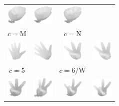 \documentclass[a4paper]{article}
\begin{document}
\begin{figure}
\begin{tabular}{cccc}
\includegraphics[width=1cm]{img/S01_C21_0058.eps} & 
\includegraphics[width=1cm]{img/S01_C22_0123.eps} & 
\includegraphics[width=1cm]{img/S01_C22m_0035.eps} \\ 
$c=\text{M}$ & & $c=\text{N}$ \\
\includegraphics[width=1cm]{img/S04_C05m_0172.eps} & 
\includegraphics[width=1cm]{img/S04_C05_0138.eps} & 
\includegraphics[width=1cm]{img/S04_C06_0073.eps} & 
\includegraphics[width=1cm]{img/S04_C06m_0080.eps} \\ 
$c=\text{5}$ & & $c=\text{6/W}$ \\
\includegraphics[width=1cm]{img/S01_C06m_0167.eps} & 
\includegraphics[width=1cm]{img/S01_C06_0015.eps} & 
\includegraphics[width=1cm]{img/S01_C07_0013.eps} & 
\includegraphics[width=1cm]{img/S01_C07m_0171.eps} \\ 

\end{tabular}
\end{figure}
\end{document}
